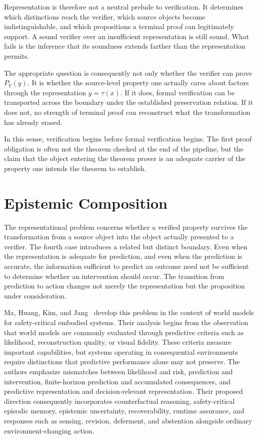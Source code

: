 \documentclass[11pt]{article}
\begin{document}
Representation is therefore not a neutral prelude to verification. It determines which distinctions reach the verifier, which source objects become indistinguishable, and which propositions a terminal proof can legitimately support. A sound verifier over an insufficient representation is still sound. What fails is the inference that its soundness extends farther than the representation permits.

The appropriate question is consequently not only whether the verifier can prove $P_Y(y)$. It is whether the source-level property one actually cares about factors through the representation $y=\tau(x)$. If it does, formal verification can be transported across the boundary under the established preservation relation. If it does not, no strength of terminal proof can reconstruct what the transformation has already erased.

In this sense, verification begins before formal verification begins. The first proof obligation is often not the theorem checked at the end of the pipeline, but the claim that the object entering the theorem prover is an adequate carrier of the property one intends the theorem to establish.

\section{Epistemic Composition}

The representational problem concerns whether a verified property survives the transformation from a source object into the object actually presented to a verifier. The fourth case introduces a related but distinct boundary. Even when the representation is adequate for prediction, and even when the prediction is accurate, the information sufficient to predict an outcome need not be sufficient to determine whether an intervention should occur. The transition from prediction to action changes not merely the representation but the proposition under consideration.

Ma, Huang, Kim, and Jang~\cite{ma2026} develop this problem in the context of world models for safety-critical embodied systems. Their analysis begins from the observation that world models are commonly evaluated through predictive criteria such as likelihood, reconstruction quality, or visual fidelity. These criteria measure important capabilities, but systems operating in consequential environments require distinctions that predictive performance alone may not preserve. The authors emphasize mismatches between likelihood and risk, prediction and intervention, finite-horizon prediction and accumulated consequences, and predictive representation and decision-relevant representation. Their proposed direction consequently incorporates counterfactual reasoning, safety-critical episodic memory, epistemic uncertainty, recoverability, runtime assurance, and responses such as sensing, revision, deferment, and abstention alongside ordinary environment-changing action.
\end{document}
